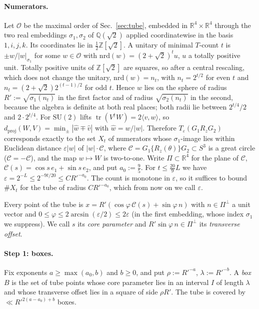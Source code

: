 \documentclass[aps,prx,twocolumn,superscriptaddress,nofootinbib,longbibliography]{revtex4-2}
\theoremstyle{plain}
\theoremstyle{definition}
\theoremstyle{remark}
\newcommand{\dproj}{d_{\mathrm{proj}}}
\newcommand{\Z}{\mathbb{Z}}
\newcommand{\Q}{\mathbb{Q}}
\newcommand{\R}{\mathbb{R}}
\newcommand{\tr}{\operatorname{tr}}
\begin{document}
\paragraph{Numerators.} Let $\mathcal O$ be the maximal order of Sec.~\ref{sec:tube}, embedded in $\R^4\times\R^4$ through the two real embeddings $\sigma_1,\sigma_2$ of $\Q(\sqrt2)$ applied coordinatewise in the basis $1,i,j,k$. Its coordinates lie in $\tfrac12\Z[\sqrt2]$. A unitary of minimal $T$-count $t$ is $\pm w/|w|_{\sigma_1}$ for some $w\in\mathcal O$ with $\mathrm{nrd}(w)=(2+\sqrt2)^tu$, $u$ a totally positive unit. Totally positive units of $\Z[\sqrt2]$ are squares, so after a central rescaling, which does not change the unitary, $\mathrm{nrd}(w)=n_t$, with $n_t=2^{t/2}$ for even $t$ and $n_t=(2+\sqrt2)2^{(t-1)/2}$ for odd $t$. Hence $w$ lies on the sphere of radius $R':=\sqrt{\sigma_1(n_t)}$ in the first factor and of radius $\sqrt{\sigma_2(n_t)}$ in the second, because the algebra is definite at both real places; both radii lie between $2^{t/4}/2$ and $2\cdot2^{t/4}$. For $\mathrm{SU}(2)$ lifts $\tr(V^\dagger W)=2\langle v,w\rangle$, so $\dproj(W,V)=\min_\pm|\hat w\mp\hat v|$ with $\hat w=w/|w|$. Therefore $T_\varepsilon(G_1R_zG_2)$ corresponds exactly to the set $X_t$ of numerators whose $\sigma_1$-image lies within Euclidean distance $\varepsilon|w|$ of $|w|\cdot\mathcal C$, where $\mathcal C=G_1\{R_z(\theta)\}G_2\subset S^3$ is a great circle ($\mathcal C=-\mathcal C$), and the map $w\mapsto W$ is two-to-one. Write $\Pi\subset\R^4$ for the plane of $\mathcal C$, $\mathcal C(s)=\cos s\,e_1+\sin s\,e_2$, and put $a_0:=\tfrac95$. For $t\le\tfrac{20}9L$ we have $\varepsilon=2^{-L}\le2^{-9t/20}\le CR'^{-a_0}$. The count is monotone in $\varepsilon$, so it suffices to bound $\#X_t$ for the tube of radius $CR'^{-a_0}$, which from now on we call $\varepsilon$.

Every point of the tube is $x=R'(\cos\varphi\,\mathcal C(s)+\sin\varphi\,n)$ with $n\in\Pi^\perp$ a unit vector and $0\le\varphi\le2\arcsin(\varepsilon/2)\le2\varepsilon$ (in the first embedding, whose index $\sigma_1$ we suppress). We call $s$ its \emph{core parameter} and $R'\sin\varphi\,n\in\Pi^\perp$ its \emph{transverse offset}.

\paragraph{Step 1: boxes.} Fix exponents $a\ge\max(a_0,b)$ and $b\ge0$, and put $\rho:=R'^{-a}$, $\lambda:=R'^{-b}$. A \emph{box} $B$ is the set of tube points whose core parameter lies in an interval $I$ of length $\lambda$ and whose transverse offset lies in a square of side $\rho R'$. The tube is covered by $\ll R'^{2(a-a_0)+b}$ boxes.
\end{document}
